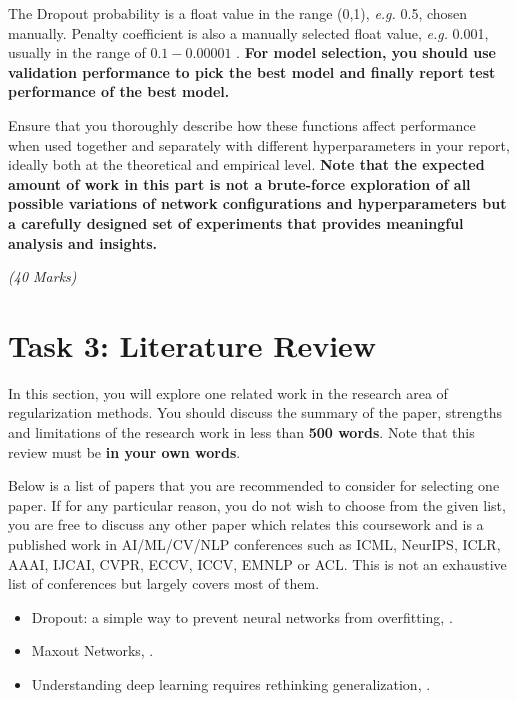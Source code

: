\documentclass[11pt,]{article}
\begin{document}
The Dropout probability is a float value in the range (0,1), \textit{e.g.} 0.5, chosen manually. Penalty coefficient is also a manually selected float value, \textit{e.g.} 0.001, usually in the range of $0.1 - 0.00001$ .  
\textbf{For model selection, you should use validation performance to pick the best model and finally report test performance of the best model.}


Ensure that you thoroughly describe how these functions affect performance when used together and separately with different hyperparameters in your report, ideally both at the theoretical and empirical level. 
\textbf{Note that the expected amount of work in this part is not a brute-force exploration of all possible variations of network configurations and hyperparameters but a carefully designed set of experiments that provides meaningful analysis and insights.}

\emph{(40 Marks)}

\section{Task 3: Literature Review}
\label{sec:part3}

In this section, you will explore one related work in the research area of regularization methods. You should discuss the summary of the paper, strengths and limitations of the research work in less than \textbf{ 500 words}. Note that this review must be \textbf{in your own words}. 

Below is a list of papers that you are recommended to consider for selecting one paper. If for any particular reason, you do not wish to choose from the given list, you are free to discuss any other paper which relates this coursework and is a published work in AI/ML/CV/NLP conferences such as ICML, NeurIPS, ICLR, AAAI, IJCAI, CVPR, ECCV, ICCV, EMNLP or ACL. This is not an exhaustive list of conferences but largely covers most of them. 



\begin{itemize} 
    \item Dropout: a simple way to prevent neural networks from overfitting, \cite{srivastava2014dropout}.
    \item Maxout Networks, \cite{goodfellow2013maxout}.
    \item Understanding deep learning requires rethinking generalization, \cite{zhang2016understanding}.
\end{itemize}
\end{document}

